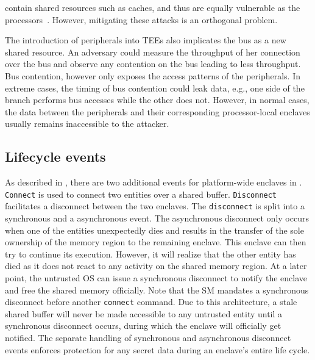 
\Sphw contain shared resources such as caches, and thus are equally vulnerable as the processors~\cite{naghibijouybari2018rendered,ramesh2018fpga,visor}. However, mitigating these attacks is an orthogonal problem.

The introduction of peripherals into TEEs also implicates the bus as a new shared resource. An adversary could measure the throughput of her connection over the bus and observe any contention on the bus leading to less throughput.
Bus contention, however only exposes the access patterns of the peripherals. In extreme cases, the timing of bus contention could leak data, e.g., one side of the branch performs bus accesses while the other does not. However, in normal cases, the data between the peripherals and their corresponding processor-local enclaves usually remains inaccessible to the attacker.



\subsection{Lifecycle events}
\label{sec:security:lifecycleevents}
As described in , there are two additional events for platform-wide enclaves in \name{}. \texttt{Connect} is used to connect two entities over a shared buffer. \texttt{Disconnect} facilitates a disconnect between the two enclaves. The \texttt{disconnect} is split into a synchronous and a asynchronous event. The asynchronous disconnect only occurs when one of the entities unexpectedly dies and results in the transfer of the sole ownership of the memory region to the remaining enclave. This enclave can then try to continue its execution. However, it will realize that the other entity has died as it does not react to any activity on the shared memory region. At a later point, the untrusted OS can issue a synchronous disconnect to notify the enclave and free the shared memory officially. Note that the SM mandates a synchronous disconnect before another \texttt{connect} command. Due to this architecture, a stale shared buffer will never be made accessible to any untrusted entity until a synchronous disconnect occurs, during which the enclave will officially get notified. The separate handling of synchronous and asynchronous disconnect events enforces protection for any secret data during an enclave's entire life cycle.


